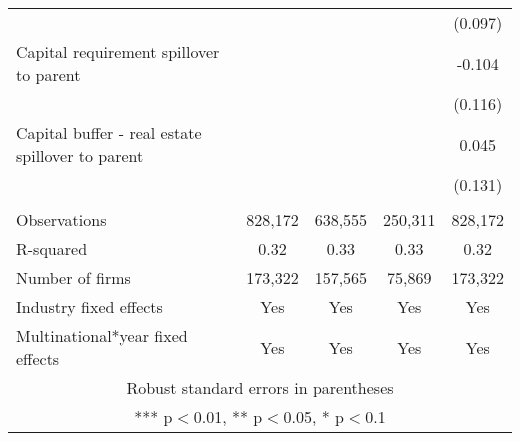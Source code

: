 \begin{tabular}{lcccc}
 &  &  &  & (0.097) \\
Capital requirement spillover to parent &  &  &  & -0.104 \\
 &  &  &  & (0.116) \\
Capital buffer - real estate spillover to parent &  &  &  & 0.045 \\
 &  &  &  & (0.131) \\
 &  &  &  &  \\
Observations & 828,172 & 638,555 & 250,311 & 828,172 \\
R-squared & 0.32 & 0.33 & 0.33 & 0.32 \\
Number of firms & 173,322 & 157,565 & 75,869 & 173,322 \\
Industry fixed effects & Yes & Yes & Yes & Yes \\
 Multinational*year fixed effects & Yes & Yes & Yes & Yes \\ \hline
\multicolumn{5}{c}{ Robust standard errors in parentheses} \\
\multicolumn{5}{c}{ *** p$<$0.01, ** p$<$0.05, * p$<$0.1} \\
\end{tabular}
